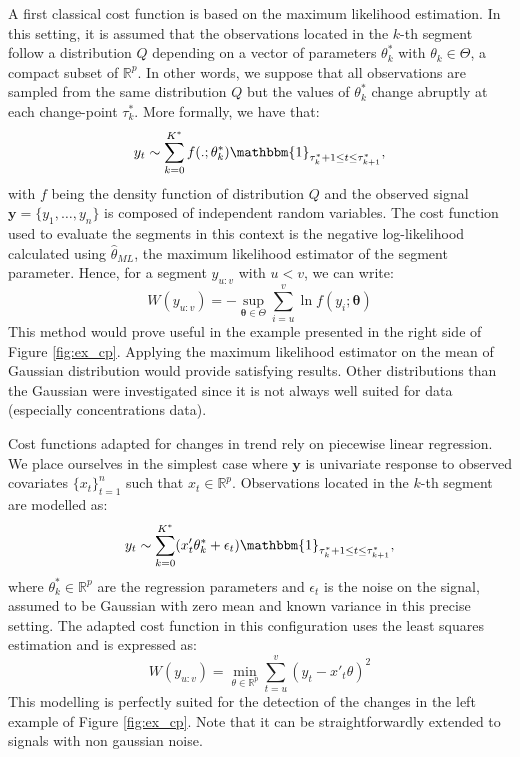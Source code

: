 A first classical cost function is based on the maximum likelihood estimation. In this setting, it is assumed that the observations located in the $k$-th segment follow a distribution $Q$ depending on a vector of parameters $\theta^*_k$ with $\theta_k \in \Theta$, a compact subset of $\mathbb{R}^p$. In other words, we suppose that all observations are sampled from the same distribution $Q$ but the values of $\theta^*_k$ change abruptly at each change-point $\tau^*_k$. 
More formally, we have that:
\begin{equation}
y_t \sim \sum_{k=0}^{K^*}f(.;\theta^*_k)\mathbbm{1}_{\tau^*_{k}+1\leq t \leq \tau^*_{k+1}},
\end{equation}
with $f$ being the density function of distribution $Q$ and the observed signal $\bm y =\{y_1,\dots,y_n\}$ is composed of independent random variables. The cost function used to evaluate the segments in this context is the negative log-likelihood calculated using $\hat\theta_{ML}$, the maximum likelihood estimator of the segment parameter. Hence, for a segment $y_{u:v}$ with $u < v$, we can write:  
\begin{equation}
W(y_{u:v}) = -\sup_{\bm \theta \in \Theta} \sum_{i = u}^{v} \ln f(y_i; \bm \theta)
\end{equation}
This method would prove useful in the example presented in the right side of Figure \ref{fig:ex_cp}. Applying the maximum likelihood estimator on the mean of Gaussian distribution would provide satisfying results. Other distributions than the Gaussian were investigated \citep{Maidstone2016a,Frick2014} since it is not always well suited for data (especially concentrations data).  

Cost functions adapted for changes in trend rely on piecewise linear regression. We place ourselves in the simplest case where $\bm y$ is univariate response to observed covariates $\{x_t\}_{t=1}^n$ such that $x_t \in \mathbb{R}^p$. Observations located in the $k$-th segment are modelled as: %
\begin{equation}
y_t \sim \sum_{k=0}^{K^*}(x'_t\theta^*_k + \epsilon_t)\mathbbm{1}_{\tau^*_{k}+1\leq t \leq \tau^*_{k+1}},
\end{equation}   
where $\theta^*_k \in \mathbb{R}^p$ are the regression parameters and $\epsilon_t$ is the noise on the signal, assumed to be Gaussian with zero mean and known variance in this precise setting. The adapted cost function in this configuration uses the least squares estimation and is expressed as:
\begin{equation}
W(y_{u:v}) = \min_{\theta \in \mathbb{R}^p}\sum_{t=u}^v(y_t-x'_t\theta)^2
\end{equation}
This modelling is perfectly suited for the detection of the changes in the left example of Figure \ref{fig:ex_cp}. Note that it can be straightforwardly extended to signals with non gaussian noise.

